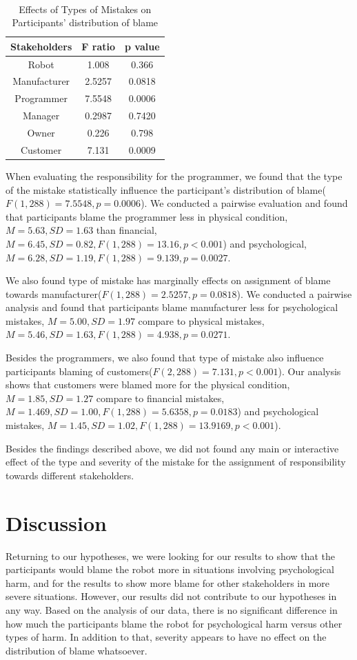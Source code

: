 \documentclass{sigchi}
\begin{document}
\hspace{1 mm} \\
\begin{table}[h]
  \centering
  \begin{tabular}{ccc}
    Stakeholders & F ratio & p value\\
    \hline
    Robot & 1.008 & 0.366\\
    Manufacturer & 2.5257 & 0.0818\\
    Programmer & 7.5548 & 0.0006 \\
    Manager & 0.2987 & 0.7420 \\
    Owner & 0.226 & 0.798 \\
    Customer & 7.131 & 0.0009 \\
    \hline
  \end{tabular}
  \caption{Effects of Types of Mistakes on Participants' distribution of blame}
  \label{tab:table2}
\end{table}


When evaluating the responsibility for the programmer, we found that the type of the mistake statistically influence the participant's distribution of blame($F(1,288)=7.5548, p = 0.0006$). We conducted a pairwise evaluation and found that participants blame the programmer less in physical condition, $M=5.63, SD=1.63$ than financial, $M=6.45, SD=0.82, F(1,288)=13.16, p < 0.001$) and psychological, $M=6.28, SD=1.19, F(1,288)=9.139, p = 0.0027$.

We also found type of mistake has marginally effects on assignment of blame towards manufacturer($F(1,288)=2.5257, p = 0.0818$). We conducted a pairwise analysis and found that participants blame manufacturer less for psychological mistakes, $M=5.00, SD=1.97$ compare to physical mistakes, $M=5.46, SD=1.63, F(1,288)=4.938, p=0.0271$.

Besides the programmers, we also found that type of mistake also influence participants blaming of customers($F(2,288)=7.131, p < 0.001$). Our analysis shows that customers were blamed more for the physical condition,$M=1.85, SD=1.27$ compare to financial mistakes,$M=1.469, SD=1.00, F(1,288)=5.6358, p = 0.0183$) and psychological mistakes, $M=1.45, SD=1.02, F(1,288)=13.9169, p < 0.001$).

Besides the findings described above, we did not found any main or interactive effect of the type and severity of the mistake for the assignment of responsibility towards different stakeholders.

\section{Discussion}
Returning to our hypotheses, we were looking for our results to show that the participants would blame the robot more in situations involving psychological harm, and for the results to show more blame for other stakeholders in more severe situations. However, our results did not contribute to our hypotheses in any way. Based on the analysis of our data, there is no significant difference in how much the participants blame the robot for psychological harm versus other types of harm. In addition to that, severity appears to have no effect on the distribution of blame whatsoever.
\end{document}
